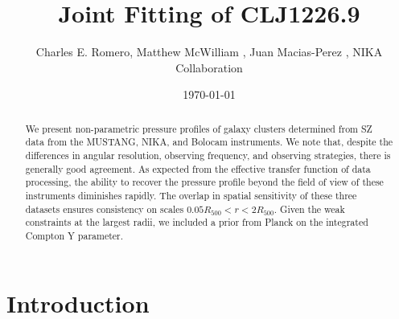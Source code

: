 \documentclass[iop,numberedappendix,apj]{emulateapj}
\begin{document}
\title{Joint Fitting of CLJ1226.9}
\author{
  Charles E. Romero,
  Matthew McWilliam ,
  Juan Macias-Perez ,
  NIKA Collaboration 
} 
\date{\today}



\begin{abstract}
  We present non-parametric pressure profiles of galaxy clusters determined from SZ data from the
  MUSTANG, NIKA, and Bolocam instruments. We note that, despite the differences in angular resolution,
  observing frequency, and observing strategies, there is generally good agreement. As expected from
  the effective transfer function of data processing, the ability to recover the pressure profile
  beyond the field of view of these instruments diminishes rapidly. The overlap in spatial sensitivity
  of these three datasets ensures consistency on scales $0.05 R_{500} < r < 2 R_{500}$. Given the
  weak constraints at the largest radii, we included a prior from Planck on the integrated
  Compton Y parameter.
\end{abstract}


\maketitle

\section{Introduction}
\label{sec:intro}

\end{document}
